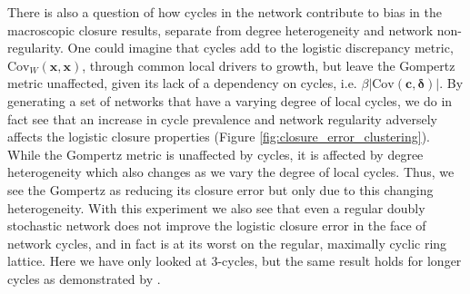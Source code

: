\documentclass{article}
\begin{document}
There is also a question of how cycles in the network contribute to bias in the macroscopic closure results, separate from degree heterogeneity and network non-regularity. One could imagine that cycles add to the logistic discrepancy metric, $\text{Cov}_W(\mathbf{x},\mathbf{x})$, through common local drivers to growth, but leave the Gompertz
metric unaffected, given its lack of a dependency on cycles, i.e. $\beta|\text{Cov}(\mathbf{c},\boldsymbol{\delta})|$. By generating a set of networks that have a varying degree of local cycles, we do in fact see that an increase in cycle prevalence and network regularity adversely affects the logistic closure properties (Figure \ref{fig:closure_error_clustering}). While the Gompertz metric is unaffected by cycles, it is affected by degree heterogeneity which also changes as we vary the degree of local cycles. Thus, we see the Gompertz as reducing its closure error but only due to this changing heterogeneity. With this experiment we also see that even a regular doubly stochastic network does not improve the logistic closure error in the face of network cycles, and in fact is at its worst on the regular, maximally cyclic ring lattice. Here we have only looked at 3-cycles, but the same result holds for longer cycles as demonstrated by \citet{wuyts2022meanfield}.
\end{document}
